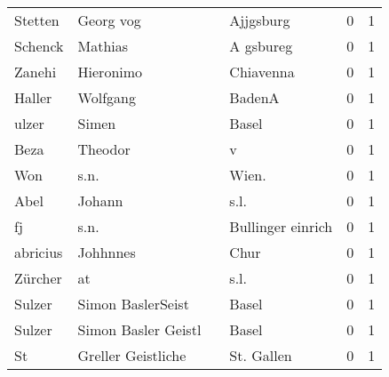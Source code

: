 \begin{tabular}{llllrr}
                  Stetten &                          Georg vog &             &                                   Ajjgsburg &          0 &         1 \\
                  Schenck &                            Mathias &             &                                   A gsbureg &          0 &         1 \\
                   Zanehi &                          Hieronimo &             &                                   Chiavenna &          0 &         1 \\
                   Haller &                           Wolfgang &             &                                      BadenA &          0 &         1 \\
                    ulzer &                              Simen &             &                                       Basel &          0 &         1 \\
                     Beza &                            Theodor &             &                                           v &          0 &         1 \\
                      Won &                               s.n. &             &                                      Wien.  &          0 &         1 \\
                     Abel &                             Johann &             &                                        s.l. &          0 &         1 \\
                       fj &                               s.n. &             &                           Bullinger einrich &          0 &         1 \\
                 abricius &                           Johhnnes &             &                                        Chur &          0 &         1 \\
                  Zürcher &                                 at &             &                                        s.l. &          0 &         1 \\
                   Sulzer &                  Simon BaslerSeist &             &                                       Basel &          0 &         1 \\
                   Sulzer &                Simon Basler Geistl &             &                                       Basel &          0 &         1 \\
                       St &                 Greller Geistliche &             &                                  St. Gallen &          0 &         1 \\

\end{tabular}
